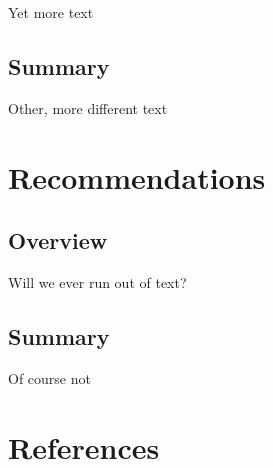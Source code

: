 \documentclass[
]{article}
\begin{document}
Yet more text

\hypertarget{summary-3}{%
\subsection{Summary}\label{summary-3}}

Other, more different text

\hypertarget{recommendations}{%
\section{Recommendations}\label{recommendations}}

\hypertarget{overview-4}{%
\subsection{Overview}\label{overview-4}}

Will we ever run out of text?

\hypertarget{summary-4}{%
\subsection{Summary}\label{summary-4}}

Of course not

\hypertarget{references}{%
\section*{References}\label{references}}
\end{document}

